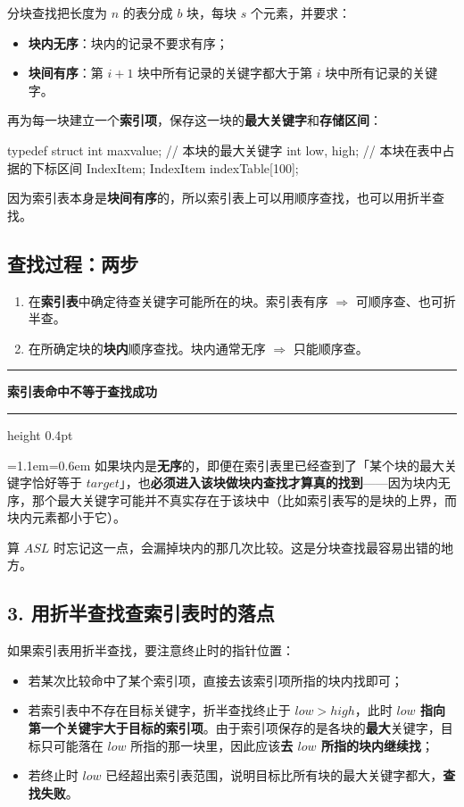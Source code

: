 \documentclass[11pt,openany,UTF8]{ctexbook}
\newcommand{\callouthead}[2]{%
  \par\addvspace{7pt}\noindent
  {\color{#1}\rule[-0.15em]{3pt}{1.05em}}\hspace{0.5em}%
  {\bfseries\color{#1}#2}\par\nobreak\vspace{-0.35em}%
  {\color{rulesep}\hrule height 0.4pt}\nobreak\vspace{0.45em}%
  \begingroup\small\setlength{\parindent}{0pt}%
  \leftskip=1.1em\rightskip=0.6em\noindent\ignorespaces}
\newcommand{\calloutend}{\par\endgroup\addvspace{7pt}}
\newenvironment{callwarn}[1]{\callouthead{warnbar}{#1}}{\calloutend}
\begin{document}
分块查找把长度为 $n$ 的表分成 $b$ 块，每块 $s$ 个元素，并要求：

\begin{itemize}
\item \textbf{块内无序}：块内的记录不要求有序；
\item \textbf{块间有序}：第 $i+1$ 块中所有记录的关键字都大于第 $i$ 块中所有记录的关键字。
\end{itemize}
再为每一块建立一个\textbf{索引项}，保存这一块的\textbf{最大关键字}和\textbf{存储区间}：

\begin{codebox}
typedef struct {
    int maxvalue;      // 本块的最大关键字
    int low, high;     // 本块在表中占据的下标区间
} IndexItem;
IndexItem indexTable[100];
\end{codebox}

因为索引表本身是\textbf{块间有序}的，所以索引表上可以用顺序查找，也可以用折半查找。

\subsection{查找过程：两步}

\begin{enumerate}
\item 在\textbf{索引表}中确定待查关键字可能所在的块。索引表有序 $\Rightarrow$ 可顺序查、也可折半查。
\item 在所确定块的\textbf{块内}顺序查找。块内通常无序 $\Rightarrow$ 只能顺序查。
\end{enumerate}
\begin{callwarn}{索引表命中不等于查找成功}
如果块内是\textbf{无序}的，即便在索引表里已经查到了「某个块的最大关键字恰好等于 $target$」，也\textbf{必须进入该块做块内查找才算真的找到}——因为块内无序，那个最大关键字可能并不真实存在于该块中（比如索引表写的是块的上界，而块内元素都小于它）。

算 $ASL$ 时忘记这一点，会漏掉块内的那几次比较。这是分块查找最容易出错的地方。

\end{callwarn}

\subsection*{3. 用折半查找查索引表时的落点}

如果索引表用折半查找，要注意终止时的指针位置：

\begin{itemize}
\item 若某次比较命中了某个索引项，直接去该索引项所指的块内找即可；
\item 若索引表中不存在目标关键字，折半查找终止于 $low>high$，此时 \textbf{$low$ 指向第一个关键宇大于目标的索引项}。由于索引项保存的是各块的\textbf{最大}关键字，目标只可能落在 $low$ 所指的那一块里，因此应该\textbf{去 $low$ 所指的块内继续找}；
\item 若终止时 $low$ 已经超出索引表范围，说明目标比所有块的最大关键字都大，\textbf{查找失败}。
\end{itemize}
\end{document}
